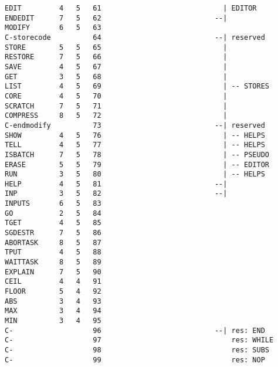 \begin{verbatim}
EDIT         4   5   61                             | EDITOR
ENDEDIT      7   5   62                           --|
MODIFY       6   5   63
C-storecode          64                           --| reserved
STORE        5   5   65                             |
RESTORE      7   5   66                             |
SAVE         4   5   67                             |
GET          3   5   68                             |
LIST         4   5   69                             | -- STORES
CORE         4   5   70                             |
SCRATCH      7   5   71                             |
COMPRESS     8   5   72                             |
C-endmodify          73                           --| reserved
SHOW         4   5   76                             | -- HELPS
TELL         4   5   77                             | -- HELPS
ISBATCH      7   5   78                             | -- PSEUDO
ERASE        5   5   79                             | -- EDITOR
RUN          3   5   80                             | -- HELPS
HELP         4   5   81                           --|
INP          3   5   82                           --|
INPUTS       6   5   83
GO           2   5   84
TGET         4   5   85
SGDESTR      7   5   86
ABORTASK     8   5   87
TPUT         4   5   88
WAITTASK     8   5   89
EXPLAIN      7   5   90
CEIL         4   4   91
FLOOR        5   4   92
ABS          3   4   93
MAX          3   4   94
MIN          3   4   95
C-                   96                           --| res: END
C-                   97                               res: WHILE
C-                   98                               res: SUBS
C-                   99                               res: NOP
\end{verbatim}

